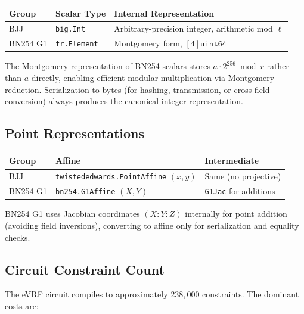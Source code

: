 \documentclass[11pt,a4paper]{article}
\begin{document}
\begin{center}
\renewcommand{\arraystretch}{1.3}
\begin{tabular}{@{}llp{6cm}@{}}
\toprule
\textbf{Group} & \textbf{Scalar Type} & \textbf{Internal Representation} \\
\midrule
BJJ & \texttt{big.Int} & Arbitrary-precision integer, arithmetic mod $\ell$ \\
BN254 G1 & \texttt{fr.Element} & Montgomery form, $[4]\texttt{uint64}$ \\
\bottomrule
\end{tabular}
\end{center}

The Montgomery representation of BN254 scalars stores $a \cdot 2^{256} \bmod r$
rather than $a$ directly, enabling efficient modular multiplication via
Montgomery reduction. Serialization to bytes (for hashing, transmission, or
cross-field conversion) always produces the canonical integer representation.

\subsection{Point Representations}

\begin{center}
\renewcommand{\arraystretch}{1.3}
\begin{tabular}{@{}lll@{}}
\toprule
\textbf{Group} & \textbf{Affine} & \textbf{Intermediate} \\
\midrule
BJJ & \texttt{twistededwards.PointAffine} $(x, y)$ & Same (no projective) \\
BN254 G1 & \texttt{bn254.G1Affine} $(X, Y)$ & \texttt{G1Jac} for additions \\
\bottomrule
\end{tabular}
\end{center}

BN254 G1 uses Jacobian coordinates $(X:Y:Z)$ internally for point addition
(avoiding field inversions), converting to affine only for serialization and
equality checks.

\subsection{Circuit Constraint Count}

The eVRF circuit compiles to approximately $238{,}000$ constraints. The
dominant costs are:
\end{document}

